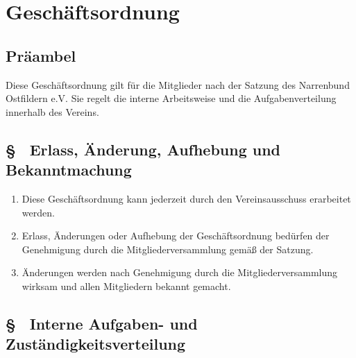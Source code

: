 \setcounter{goparagraphcounter}{1}

\section{Geschäftsordnung}

\subsection{Präambel}
Diese Geschäftsordnung gilt für die Mitglieder nach  der Satzung des Narrenbund Ostfildern e.V. Sie regelt die interne Arbeitsweise und die Aufgabenverteilung innerhalb des Vereins. 

\subsection{§ \thegoparagraphcounter\ Erlass, Änderung, Aufhebung und Bekanntmachung} \label{go:par:erlass_aenderung_aufhebung}
\begin{enumerate}
    \item \label{go:abs:kwyvk7} Diese Geschäftsordnung kann jederzeit durch den Vereinsausschuss erarbeitet werden.

    \item \label{go:abs:1rro4u} Erlass, Änderungen oder Aufhebung der Geschäftsordnung bedürfen der Genehmigung durch die Mitgliederversammlung gemäß  der Satzung.

    \item \label{go:abs:8z4qs6} Änderungen werden nach Genehmigung durch die Mitgliederversammlung wirksam und allen Mitgliedern bekannt gemacht.
\end{enumerate}

\subsection{§ \thegoparagraphcounter\ Interne Aufgaben- und Zuständigkeitsverteilung} \label{go:par:intern_aufgaben_zustaendigkeit}
